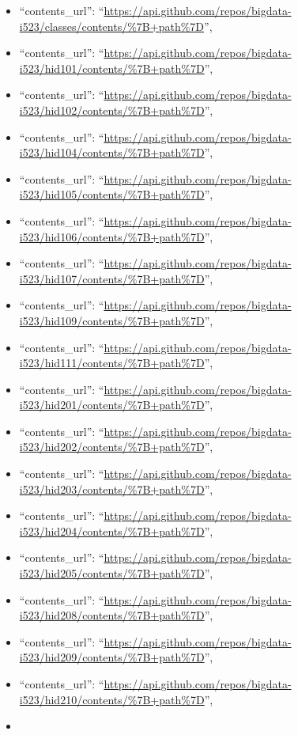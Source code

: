 \begin{itemize}
\item
  ``contents\_url'':
  ``\url{https://api.github.com/repos/bigdata-i523/classes/contents/\%7B+path\%7D}'',
\item
  ``contents\_url'':
  ``\url{https://api.github.com/repos/bigdata-i523/hid101/contents/\%7B+path\%7D}'',
\item
  ``contents\_url'':
  ``\url{https://api.github.com/repos/bigdata-i523/hid102/contents/\%7B+path\%7D}'',
\item
  ``contents\_url'':
  ``\url{https://api.github.com/repos/bigdata-i523/hid104/contents/\%7B+path\%7D}'',
\item
  ``contents\_url'':
  ``\url{https://api.github.com/repos/bigdata-i523/hid105/contents/\%7B+path\%7D}'',
\item
  ``contents\_url'':
  ``\url{https://api.github.com/repos/bigdata-i523/hid106/contents/\%7B+path\%7D}'',
\item
  ``contents\_url'':
  ``\url{https://api.github.com/repos/bigdata-i523/hid107/contents/\%7B+path\%7D}'',
\item
  ``contents\_url'':
  ``\url{https://api.github.com/repos/bigdata-i523/hid109/contents/\%7B+path\%7D}'',
\item
  ``contents\_url'':
  ``\url{https://api.github.com/repos/bigdata-i523/hid111/contents/\%7B+path\%7D}'',
\item
  ``contents\_url'':
  ``\url{https://api.github.com/repos/bigdata-i523/hid201/contents/\%7B+path\%7D}'',
\item
  ``contents\_url'':
  ``\url{https://api.github.com/repos/bigdata-i523/hid202/contents/\%7B+path\%7D}'',
\item
  ``contents\_url'':
  ``\url{https://api.github.com/repos/bigdata-i523/hid203/contents/\%7B+path\%7D}'',
\item
  ``contents\_url'':
  ``\url{https://api.github.com/repos/bigdata-i523/hid204/contents/\%7B+path\%7D}'',
\item
  ``contents\_url'':
  ``\url{https://api.github.com/repos/bigdata-i523/hid205/contents/\%7B+path\%7D}'',
\item
  ``contents\_url'':
  ``\url{https://api.github.com/repos/bigdata-i523/hid208/contents/\%7B+path\%7D}'',
\item
  ``contents\_url'':
  ``\url{https://api.github.com/repos/bigdata-i523/hid209/contents/\%7B+path\%7D}'',
\item
  ``contents\_url'':
  ``\url{https://api.github.com/repos/bigdata-i523/hid210/contents/\%7B+path\%7D}'',
\item

\end{itemize}
